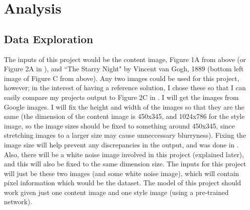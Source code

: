\documentclass[12pt]{article}
\begin{document}
\section{Analysis}
\subsection{Data Exploration}
The inputs of this project would be the content image, Figure 1A from above (or Figure 2A in \cite{Neural}), and ``The Starry Night" by Vincent van Gogh, 1889 (bottom left image of Figure C from above). Any two images could be used for this project, however; in the interest of having a reference solution, I chose these so that I can easily compare my projects output to Figure 2C in \cite{Image}. I will get the images from Google images. I will fix the height and width of the images so that they are the same (the dimension of the content image is 450x345, and 1024x786 for the style image, so the image sizes should be fixed to something around 450x345, since stretching images to a larger size may cause unneccessary blurryness). Fixing the image size will help prevent any discrepancies in the output, and was done in \cite{Neural}. Also, there will be a white noise image involved in this project (explained later), and this will also be fixed to the same dimension size. The inputs for this project will just be these two images (and some white noise image), which will contain pixel information which would be the dataset. The model of this project should work given just one content image and one style image (using a pre-trained network).
 
\end{document}
